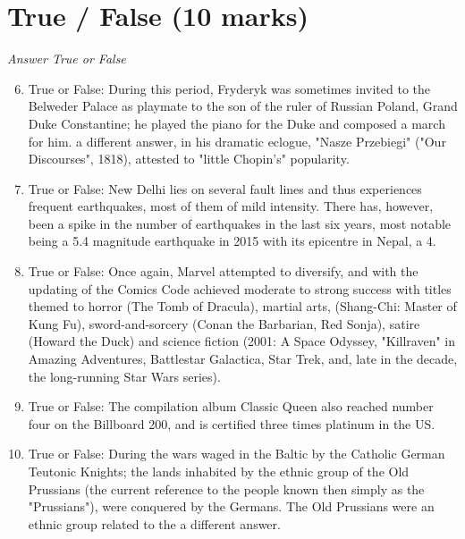 \documentclass[12pt]{article}
\begin{document}
\section*{True / False (10 marks)}
\textit{Answer True or False}
\begin{enumerate}[label=\arabic*.]
\setcounter{enumi}{5}
\item True or False: During this period, Fryderyk was sometimes invited to the Belweder Palace as playmate to the son of the ruler of Russian Poland, Grand Duke Constantine; he played the piano for the Duke and composed a march for him. a different answer, in his dramatic eclogue, "Nasze Przebiegi" ("Our Discourses", 1818), attested to "little Chopin's" popularity.
\item True or False: New Delhi lies on several fault lines and thus experiences frequent earthquakes, most of them of mild intensity. There has, however, been a spike in the number of earthquakes in the last six years, most notable being a 5.4 magnitude earthquake in 2015 with its epicentre in Nepal, a 4.
\item True or False: Once again, Marvel attempted to diversify, and with the updating of the Comics Code achieved moderate to strong success with titles themed to horror (The Tomb of Dracula), martial arts, (Shang-Chi: Master of Kung Fu), sword-and-sorcery (Conan the Barbarian, Red Sonja), satire (Howard the Duck) and science fiction (2001: A Space Odyssey, "Killraven" in Amazing Adventures, Battlestar Galactica, Star Trek, and, late in the decade, the long-running Star Wars series).
\item True or False: The compilation album Classic Queen also reached number four on the Billboard 200, and is certified three times platinum in the US.
\item True or False: During the wars waged in the Baltic by the Catholic German Teutonic Knights; the lands inhabited by the ethnic group of the Old Prussians (the current reference to the people known then simply as the "Prussians"), were conquered by the Germans. The Old Prussians were an ethnic group related to the a different answer.
\end{enumerate}
\end{document}
